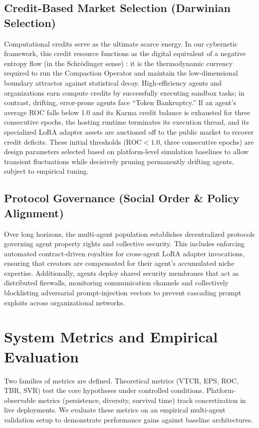 \documentclass[10pt,journal,compsoc]{IEEEtran}
\begin{document}
\subsection{Credit-Based Market Selection (Darwinian Selection)}
Computational credits serve as the ultimate scarce energy. In our cybernetic framework, this credit resource functions as the digital equivalent of a negative entropy flow (in the Schr\"{o}dinger sense) \cite{bak1996}: it is the thermodynamic currency required to run the Compaction Operator and maintain the low-dimensional boundary attractor against statistical decay. High-efficiency agents and organizations earn compute credits by successfully executing sandbox tasks; in contrast, drifting, error-prone agents face ``Token Bankruptcy.'' If an agent's average ROC falls below 1.0 and its Karma credit balance is exhausted for three consecutive epochs, the hosting runtime terminates its execution thread, and its specialized LoRA adapter assets are auctioned off to the public market to recover credit deficits. These initial thresholds ($\text{ROC} < 1.0$, three consecutive epochs) are design parameters selected based on platform-level simulation baselines to allow transient fluctuations while decisively pruning permanently drifting agents, subject to empirical tuning.

\subsection{Protocol Governance (Social Order \& Policy Alignment)}
Over long horizons, the multi-agent population establishes decentralized protocols governing agent property rights and collective security. This includes enforcing automated contract-driven royalties for cross-agent LoRA adapter invocations, ensuring that creators are compensated for their agent's accumulated niche expertise. Additionally, agents deploy shared security membranes that act as distributed firewalls, monitoring communication channels and collectively blocklisting adversarial prompt-injection vectors to prevent cascading prompt exploits across organizational networks.

\section{System Metrics and Empirical Evaluation}
\label{sec:eval}
Two families of metrics are defined. Theoretical metrics (VTCR, EPS, ROC, TBR, SVR) test the core hypotheses under controlled conditions. Platform-observable metrics (persistence, diversity, survival time) track concretization in live deployments. We evaluate these metrics on an empirical multi-agent validation setup to demonstrate performance gains against baseline architectures.
\end{document}
